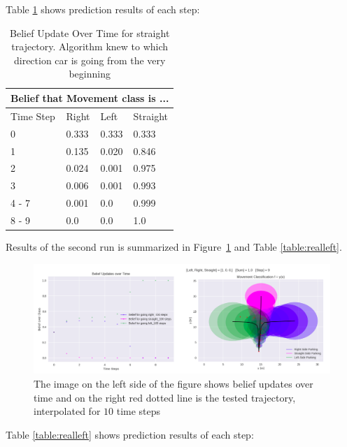 Table \ref{table:realStraight} shows prediction results of each step:

\begin{table}[H]
	\centering
	\begin{tabular}{ |p{1.5cm}||p{1.5cm}|p{1.5cm}|p{1.5cm}|}
		\hline
		\multicolumn{4}{|c|}{Belief that Movement class is ...} \\
		\hline
		Time Step & Right & Left & Straight \\
		\hline
		0 & 0.333 & 0.333 & 0.333 \\
		1 & 0.135 & 0.020 & 0.846 \\
		2 & 0.024 & 0.001 & 0.975 \\
		3 & 0.006 & 0.001 & 0.993 \\
		4 - 7 & 0.001 & 0.0   & 0.999 \\
		8 - 9 & 0.0   & 0.0   & 1.0 \\
		\hline
	\end{tabular}
	\caption{Belief Update Over Time for straight trajectory. Algorithm knew to which direction car is going from the very beginning}
	\label{table:realStraight}
\end{table}

Results of the second run is summarized in Figure~\ref{fig:Realleft} and Table \ref{table:realleft}.

\begin{figure}[H]
	\centering  	
	\includegraphics[width=13cm]{img/realLeft.png}
	\caption{The image on the left side of the figure shows belief updates over time and on the right red dotted line is the tested trajectory, interpolated for $10$ time steps}
	\label{fig:Realleft}    
\end{figure}

Table \ref{table:realleft} shows prediction results of each step:

